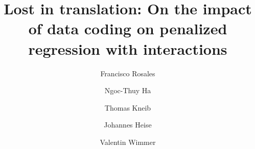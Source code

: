 \documentclass{bmcart}
\newcommand{\0}{\mathbf{0}}
\begin{document}
\begin{frontmatter}

\begin{fmbox}


\title{Lost in translation: On the impact of data coding on penalized regression with interactions}


\author[
   addressref={aff2},                   %
   email={jmartin2@gwdg.de}   %
]{ }
\author[
addressref={aff6},
]{Francisco Rosales}
\author[
addressref={aff1},
]{Ngoc-Thuy Ha}
\author[
   addressref={aff4},
]{Thomas Kneib}
\author[
addressref={aff5},
]{Johannes Heise}
\author[
addressref={aff2}
]{Valentin Wimmer}





\address[id=aff2]{%
	,
	,
}


\address[id=aff6]{%
	,
	,
}

\address[id=aff1]{%
	, %
}


\end{fmbox}
\end{frontmatter}
\end{document}
